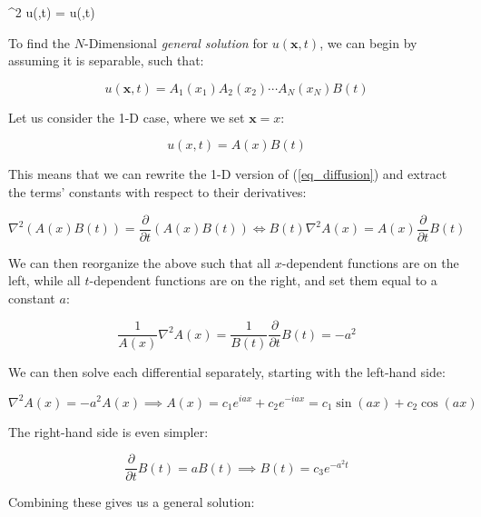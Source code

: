 \documentclass[a4paper,10pt,english]{article}
\newenvironment{boxequation}{
\begin{tcolorbox}[ams equation, enhanced, colback=black!50!green!10!white, colframe=black, fuzzy shadow={0mm}{-4pt}{-0.5pt}{0.4mm}{black!60!white}]}
{\end{tcolorbox}}
\renewcommand{\vec}[1]{\mathbf{#1}}
\begin{document}
\begin{boxequation}
\label{eq_diffusion}
\nabla^2 u(\vec{x},t) =  u(\vec{x},t)
\end{boxequation}

To find the $N$-Dimensional \textit{general solution} for $u(\vec{x},t)$, we can begin by assuming it is separable, such that:

\begin{equation*}
u(\vec{x},t) = A_1(x_1) A_2(x_2) \cdots A_N (x_N) B(t)
\end{equation*}

Let us consider the 1-D case, where we set $\vec{x} = x$:

\begin{equation*}
u(x,t) = A(x) B(t)
\end{equation*}

This means that we can rewrite the 1-D version of (\ref{eq_diffusion}) and extract the terms' constants with respect to their derivatives:

\begin{equation*}
\nabla^2 \left( A(x) B(t) \right) = \frac{\partial}{\partial t} \left( A(x) B(t) \right) \iff B(t) \nabla^2 A(x) = A(x) \frac{\partial}{\partial t} B(t)
\end{equation*}

We can then reorganize the above such that all $x$-dependent functions are on the left, while all $t$-dependent functions are on the right, and set them equal to a constant $a$:

\begin{equation*}
\frac{1}{A(x)} \nabla^2 A(x) = \frac{1}{B(t)} \frac{\partial}{\partial t} B(t) = -a^2
\end{equation*}

We can then solve each differential separately, starting with the left-hand side:

\begin{equation*}
\nabla^2 A(x) = -a^2 A(x) \implies A(x) = c_1 e^{iax} + c_2 e^{-iax} = c_1 \sin (ax) + c_2 \cos (ax)
\end{equation*}

The right-hand side is even simpler:

\begin{equation*}
\frac{\partial}{\partial t} B(t) = a B(t) \implies B(t) = c_3 e^{-a^2 t}
\end{equation*}

Combining these gives us a general solution:
\end{document}
